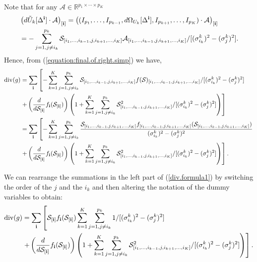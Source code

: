 Note that for any $\mathcal{A} \in \mathbb{R}^{p_1\times\cdots \times p_K}$
\begin{align*}
&\left(d\tilde{U}_k[\Delta^{\bf i}] \cdot \mathcal{A}\right)_{[\mathbf{i}]} = \left((I_{p_1},\ldots,I_{p_{k-1}},d\Omega_{U_k}[\Delta^{\bf i}],I_{p_{k+1}},\ldots,I_{p_K})\cdot \mathcal{A} \right)_{[\mathbf{i}]}\\
&= -\sum_{j=1, j\neq i_k}^{p_k}\mathcal{S}_{[i_1,\ldots,i_{k-1},j,i_{k+1},\ldots,i_K]}\mathcal{A}_{[i_1,\ldots,i_{k-1},j,i_{k+1},\ldots,i_K]}/[(\sigma_{i_k}^k)^2 - (\sigma_j^k)^2].
\end{align*}
Hence, from (\ref{equation:final.of.right.simp}) we have,
\begin{align}
\operatorname*{div}(g) &= \sum_{\bf i}\left[-\sum_{k=1}^K \sum_{j=1, j\neq i_k}^{p_k}\mathcal{S}_{[i_1,\ldots,i_{k-1},j,i_{k+1},\ldots,i_K]}f(\mathcal{S})_{[i_1,\ldots,i_{k-1},j,i_{k+1},\ldots,i_K]}/[(\sigma_{i_k}^k)^2 - (\sigma_j^k)^2]\right.\nonumber\\
 \nonumber&\left. + \left(\frac{d}{d\mathcal{S}_{[\mathbf{i}]}}f_{\mathbf{i}}(\mathcal{S}_{[\mathbf{i}]})\right) \left(1 + \sum_{k=1}^K \sum_{j=1, j\neq i_k}^{p_k}\mathcal{S}_{[i_1,\ldots,i_{k-1},j,i_{k+1},\ldots,i_K]}^2/[(\sigma_{i_k}^k)^2 - (\sigma_j^k)^2] \right)\right]  \\
&= \sum_{\bf i}\left[-\sum_{k=1}^K \sum_{j=1, j\neq i_k}^{p_k}\frac{\mathcal{S}_{[i_1,\ldots,i_{k-1},j,i_{k+1},\ldots,i_K]}f_{[i_1,\ldots,i_{k-1},j,i_{k+1},\ldots,i_K]}(\mathcal{S}_{[i_1,\ldots,i_{k-1},j,i_{k+1},\ldots,i_K]})}{(\sigma_{i_k}^k)^2 - (\sigma_j^k)^2}\right. \label{div.formula1}\\
\nonumber &\left. + \left(\frac{d}{d\mathcal{S}_{[\mathbf{i}]}}f_{\mathbf{i}}(\mathcal{S}_{[\mathbf{i}]})\right) \left(1 + \sum_{k=1}^K \sum_{j=1, j\neq i_k}^{p_k}\mathcal{S}_{[i_1,\ldots,i_{k-1},j,i_{k+1},\ldots,i_K]}^2/[(\sigma_{i_k}^k)^2 - (\sigma_j^k)^2] \right)\right].
\end{align}

We can rearrange the summations in the left part of
(\ref{div.formula1}) by switching the order of the $j$ and the $i_k$
and then altering the notation of the dummy variables to obtain:
\begin{align*}
\operatorname*{div}(g) &= \sum_{\bf i}\left[\mathcal{S}_{[\mathbf{i}]}f_{\bf i}(\mathcal{S}_{[\mathbf{i}]})\sum_{k=1}^K \sum_{j=1, j\neq i_k}^{p_k}1/[(\sigma_{i_k}^k)^2 - (\sigma_j^k)^2]\right. \\
 &\left. + \left(\frac{d}{d\mathcal{S}_{[\mathbf{i}]}}f_{\mathbf{i}}(\mathcal{S}_{[\mathbf{i}]})\right) \left(1 + \sum_{k=1}^K \sum_{j=1, j\neq i_k}^{p_k}\mathcal{S}_{[i_1,\ldots,i_{k-1},j,i_{k+1},\ldots,i_K]}^2/[(\sigma_{i_k}^k)^2 - (\sigma_j^k)^2] \right)\right].
\end{align*}

